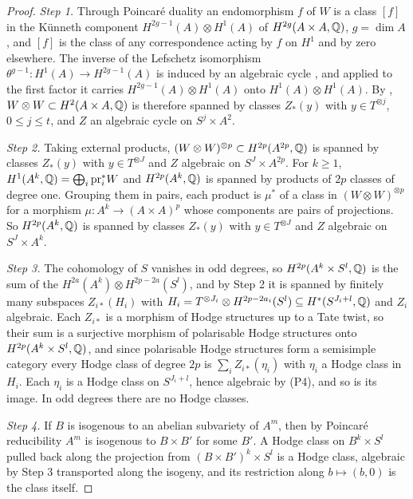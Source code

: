 \begin{proof}
\emph{Step 1.} Through Poincar\'e duality an endomorphism $f$ of $W$ is a
class $[f]$ in the K\"unneth component $H^{2g-1}(A)\otimes H^{1}(A)$ of
$H^{2g}(A\times A,\mathbb{Q})$, $g=\dim A$, and $[f]$ is the class of any
correspondence acting by $f$ on $H^{1}$ and by zero elsewhere. The inverse of
the Lefschetz isomorphism $\theta^{g-1}\colon H^{1}(A)\to H^{2g-1}(A)$ is
induced by an algebraic cycle \cite[\S2]{Kle68}, and applied to the first
factor it carries $H^{2g-1}(A)\otimes H^{1}(A)$ onto
$H^{1}(A)\otimes H^{1}(A)$. By , $W\otimes W\subset
H^{2}(A\times A,\mathbb{Q})$ is therefore spanned by classes $Z_{*}(y)$ with
$y\in T^{\otimes j}$, $0\le j\le t$, and $Z$ an algebraic cycle on
$S^{j}\times A^{2}$.

\emph{Step 2.} Taking external products, $(W\otimes W)^{\otimes p}\subset
H^{2p}(A^{2p},\mathbb{Q})$ is spanned by classes $Z_{*}(y)$ with $y\in T^{\otimes J}$
and $Z$ algebraic on $S^{J}\times A^{2p}$. For $k\ge1$,
$H^{1}(A^{k},\mathbb{Q})=\bigoplus_{i}\mathrm{pr}_{i}^{*}W$ and
$H^{2p}(A^{k},\mathbb{Q})$ is spanned by products of $2p$ classes of degree one.
Grouping them in pairs, each product is $\mu^{*}$ of a class in
$(W\otimes W)^{\otimes p}$ for a morphism $\mu\colon A^{k}\to(A\times A)^{p}$
whose components are pairs of projections. So $H^{2p}(A^{k},\mathbb{Q})$ is spanned
by classes $Z_{*}(y)$ with $y\in T^{\otimes J}$ and $Z$ algebraic on
$S^{J}\times A^{k}$.

\emph{Step 3.} The cohomology of $S$ vanishes in odd degrees, so
$H^{2p}(A^{k}\times S^{l},\mathbb{Q})$ is the sum of the
$H^{2a}(A^{k})\otimes H^{2p-2a}(S^{l})$, and by Step 2 it is spanned by
finitely many subspaces $Z_{i*}(H_{i})$ with $H_{i}=T^{\otimes J_{i}}\otimes
H^{2p-2a_{i}}(S^{l})\subseteq H^{*}(S^{J_{i}+l},\mathbb{Q})$ and $Z_{i}$ algebraic.
Each $Z_{i*}$ is a morphism of Hodge structures up to a Tate twist, so their
sum is a surjective morphism of polarisable Hodge structures onto
$H^{2p}(A^{k}\times S^{l},\mathbb{Q})$, and since polarisable Hodge structures form
a semisimple category every Hodge class of degree $2p$ is
$\sum_{i}Z_{i*}(\eta_{i})$ with $\eta_{i}$ a Hodge class in $H_{i}$. Each
$\eta_{i}$ is a Hodge class on $S^{J_{i}+l}$, hence algebraic by
\textup{(P4)}, and so is its image. In odd degrees there are no Hodge
classes.

\emph{Step 4.} If $B$ is isogenous to an abelian subvariety of $A^{m}$, then
by Poincar\'e reducibility $A^{m}$ is isogenous to $B\times B'$ for some
$B'$. A Hodge class on $B^{k}\times S^{l}$ pulled back along the projection
from $(B\times B')^{k}\times S^{l}$ is a Hodge class, algebraic by Step 3
transported along the isogeny, and its restriction along
$b\mapsto(b,0)$ is the class itself.
\end{proof}

